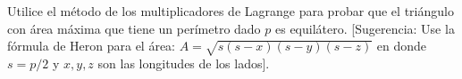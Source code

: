 \item Utilice el método de los multiplicadores de Lagrange para probar que el triángulo con área máxima que tiene un perímetro dado $p$ es equilátero. [Sugerencia: Use la fórmula de Heron para el área: $A = \sqrt{s(s-x)(s-y)(s-z)}$ en donde $s = p/2$ y $x, y, z$ son las longitudes de los lados].
